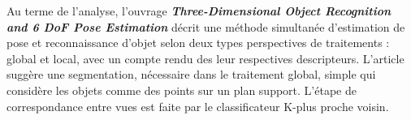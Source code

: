	Au terme de l'analyse, l'ouvrage \textbf{\textit{Three-Dimensional Object Recognition and 6 DoF Pose Estimation}} décrit une méthode simultanée d'estimation de pose et reconnaissance d'objet selon deux types perspectives de traitements : global et local, avec un compte rendu des leur respectives descripteurs. L'article suggère une segmentation, nécessaire dans le traitement global, simple qui considère les objets comme des points sur un plan support. L'étape de correspondance entre vues est faite par le classificateur K-plus proche voisin.

